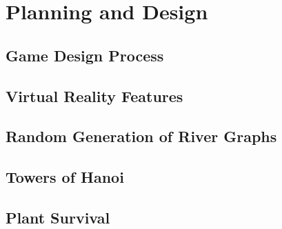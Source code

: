 \chapter{Planning and Design}
\label{chapter5}

\section{Game Design Process}
\lipsum[1-1] \cite{parikh1980adaptive}

\section{Virtual Reality Features}
\lipsum[1-1] \cite{parikh1980adaptive}

\section{Random Generation of River Graphs}
\lipsum[1-1] \cite{parikh1980adaptive}

\section{Towers of Hanoi}
\lipsum[1-1] \cite{parikh1980adaptive}

\section{Plant Survival}
\lipsum[1-1] \cite{parikh1980adaptive}